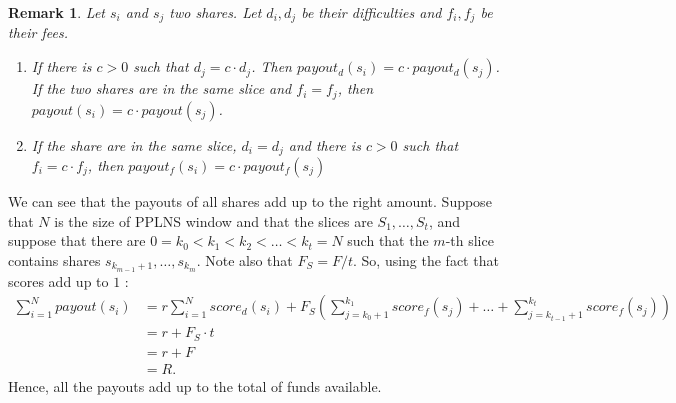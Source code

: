 \documentclass[10pt]{article}
\newtheorem{remark}{Remark}[subsection]
\begin{document}
\begin{remark}
	Let $s_i$ and $s_j$ two shares. Let $d_i,d_j$ be their difficulties and $f_i, f_j$ be their fees.
	\begin{enumerate}
		\item If there is $c>0$ such that $d_j = c\cdot d_j$. Then $payout_d(s_i) = c \cdot payout_d(s_j)$. If the two shares are in the same slice and $f_i = f_j$, then $payout(s_i) = c \cdot payout(s_j)$.
		\item If the share are in the same slice, $d_i = d_j$ and there is $c>0$ such that $f_i = c \cdot f_j$, then $payout_f(s_i) = c \cdot payout_f(s_j)$
		\end{enumerate}
\end{remark}

We can see that the payouts of all shares add up to the right amount. Suppose that $N$ is the size of PPLNS window and that the slices are $S_1, \dots, S_t$, and suppose that there are $0=k_0<k_1< k_2< \dots < k_t=N$ such that the $m$-th slice contains shares $s_{k_{m-1}+1}, \dots, s_{k_{m}}$. Note also that $F_S = F/t$. So, using the fact that scores add up to $1$ :
\begin{align*} 
\sum_{i=1} ^N payout(s_i) &= r\sum_{i=1}^N score_d(s_i) +F_{S}\left(\sum_{j=k_0+1}^{k_1} score_f(s_j)+\dots +\sum_{j=k_{t-1}+1}^{k_t} score_f(s_j)\right) \\
&= r +F_S\cdot t\\ &= r+F \\ &= R.
\end{align*}
Hence, all the payouts add up to the total of funds available.
\end{document}
